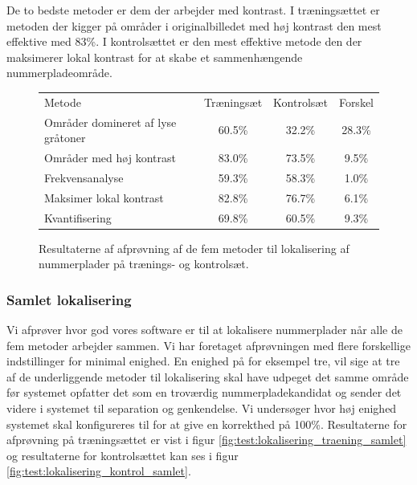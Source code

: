 De to bedste metoder er dem der arbejder med kontrast. I træningsættet er metoden der kigger på områder i originalbilledet med høj kontrast den mest effektive med 83\%. I kontrolsættet er den mest effektive metode den der maksimerer lokal kontrast for at skabe et sammenhængende nummerpladeområde. 

\begin{figure}[htp]
\centering
\begin{tabular}{|l|c|c|c|}
\hline
\rowcolor[gray]{0.9} \multicolumn{4}{|>{\columncolor[gray]{0.9}}c|}{\textbf{Individuelle metoder til lokalisering}} \\ \hline
Metode & Træningsæt & Kontrolsæt & Forskel \\ \hline
Områder domineret af lyse gråtoner & 60.5\% & 32.2\% & 28.3\% \\ \hline
Områder med høj kontrast           & 83.0\% & 73.5\% &  9.5\% \\ \hline
Frekvensanalyse                    & 59.3\% & 58.3\% &  1.0\% \\ \hline
Maksimer lokal kontrast            & 82.8\% & 76.7\% &  6.1\% \\ \hline
Kvantifisering                     & 69.8\% & 60.5\% &  9.3\% \\ \hline
\end{tabular}
\caption{Resultaterne af afprøvning af de fem metoder til lokalisering af nummerplader på trænings- og kontrolsæt.}
\label{fig:test:lokalisering_traening_kontrol}
\end{figure}


\subsubsection{Samlet lokalisering}
Vi afprøver hvor god vores software er til at lokalisere nummerplader når alle de fem metoder arbejder sammen. Vi har foretaget afprøvningen med flere forskellige indstillinger for minimal enighed. En enighed på for eksempel tre, vil sige at tre af de underliggende metoder til lokalisering skal have udpeget det samme område før systemet opfatter det som en troværdig nummerpladekandidat og sender det videre i systemet til separation og genkendelse. Vi undersøger hvor høj enighed systemet skal konfigureres til for at give en korrekthed på 100\%. Resultaterne for afprøvning på træningsættet er vist i figur \vref{fig:test:lokalisering_traening_samlet} og resultaterne for kontrolsættet kan ses i figur \vref{fig:test:lokalisering_kontrol_samlet}.

